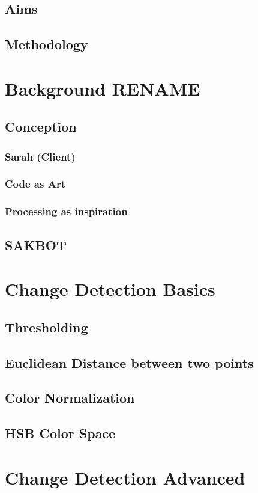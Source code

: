 \documentclass[a4paper]{report}
\begin{document}
\subsection{Aims}
\subsection{Methodology}

\section{Background RENAME}
\subsection{Conception}
\subsubsection{Sarah (Client)}
\subsubsection{Code as Art}
\subsubsection{Processing as inspiration}
\subsection{SAKBOT}

\section{Change Detection Basics}
\subsection{Thresholding}
\subsection{Euclidean Distance between two points}
\subsection{Color Normalization}
\subsection{HSB Color Space}

\section{Change Detection Advanced}
\end{document}
